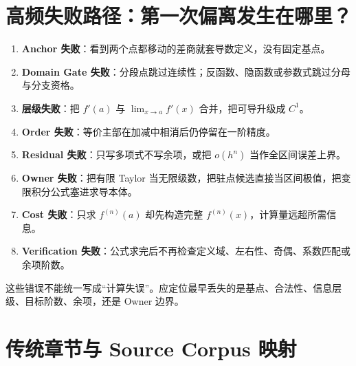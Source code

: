\documentclass[11pt,a4paper]{ctexart}
\newcommand{\kw}[1]{\textbf{\color{deep}#1}}
\begin{document}
\section{高频失败路径：第一次偏离发生在哪里？}

\begin{enumerate}
  \item \kw{Anchor 失败}：看到两个点都移动的差商就套导数定义，没有固定基点。
  \item \kw{Domain Gate 失败}：分段点跳过连续性；反函数、隐函数或参数式跳过分母与分支资格。
  \item \kw{层级失败}：把 $f'(a)$ 与 $\lim_{x\to a}f'(x)$ 合并，把可导升级成 $C^1$。
  \item \kw{Order 失败}：等价主部在加减中相消后仍停留在一阶精度。
  \item \kw{Residual 失败}：只写多项式不写余项，或把 $o(h^n)$ 当作全区间误差上界。
  \item \kw{Owner 失败}：把有限 Taylor 当无限级数，把驻点候选直接当区间极值，把变限积分公式塞进求导本体。
  \item \kw{Cost 失败}：只求 $f^{(n)}(a)$ 却先构造完整 $f^{(n)}(x)$，计算量远超所需信息。
  \item \kw{Verification 失败}：公式求完后不再检查定义域、左右性、奇偶、系数匹配或余项阶数。
\end{enumerate}

这些错误不能统一写成“计算失误”。应定位最早丢失的是基点、合法性、信息层级、目标阶数、余项，还是 Owner 边界。

\section{传统章节与 Source Corpus 映射}
\end{document}
